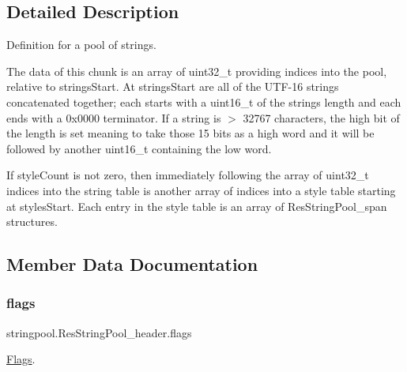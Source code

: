 \subsection{Detailed Description}
Definition for a pool of strings. 

The data of this chunk is an array of uint32\+\_\+t providing indices into the pool, relative to strings\+Start. At strings\+Start are all of the U\+T\+F-\/16 strings concatenated together; each starts with a uint16\+\_\+t of the string\textquotesingle{}s length and each ends with a 0x0000 terminator. If a string is $>$ 32767 characters, the high bit of the length is set meaning to take those 15 bits as a high word and it will be followed by another uint16\+\_\+t containing the low word.

If style\+Count is not zero, then immediately following the array of uint32\+\_\+t indices into the string table is another array of indices into a style table starting at styles\+Start. Each entry in the style table is an array of Res\+String\+Pool\+\_\+span structures. 

\subsection{Member Data Documentation}
\mbox{\label{classstringpool_1_1ResStringPool__header_a03c15e4b87b3e8d019ad6f91ac232d2e}} 
\subsubsection{\texorpdfstring{flags}{flags}}
{\footnotesize\ttfamily stringpool.\+Res\+String\+Pool\+\_\+header.\+flags}



\mbox{\hyperlink{classstringpool_1_1ResStringPool__header_1_1Flags}{Flags}}. 

\mbox{\label{classstringpool_1_1ResStringPool__header_ae6af60c9dce1d1f9aac441e56252f1e8}} 
